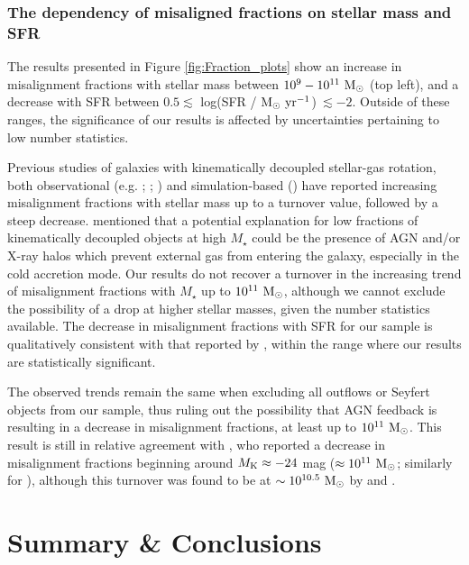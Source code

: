 \documentclass[fleqn,usenatbib]{mnras}
\begin{document}
\subsubsection{The dependency of misaligned fractions on stellar mass and SFR}
The results presented in Figure \ref{fig:Fraction_plots} show an increase in misalignment fractions with stellar mass between $10^9 - 10^{11}\ \rm{M_{\odot}}$ (top left), and a decrease with SFR between $0.5\lesssim$ log(SFR / $\rm{M_{\odot}\ yr^{-1}}$)$\ \lesssim -2$. Outside of these ranges, the significance of our results is affected by uncertainties pertaining to low number statistics. 

Previous studies of galaxies with kinematically decoupled stellar-gas rotation, both observational (e.g. \citealt{Davis2011}; \citealt{Jin2016}; \citealt{Zhou2022}) and simulation-based (\citealt{CdpLagos2015}) have reported increasing misalignment fractions with stellar mass up to a turnover value, followed by a steep decrease. 
\cite{Davis2011} mentioned that a potential explanation for low  fractions of kinematically decoupled objects at high $M_{\star}$ could be the presence of AGN and/or X-ray halos which prevent external gas from entering the galaxy, especially in the cold accretion mode. Our results do not recover a turnover in the increasing trend of misalignment fractions with $M_{\star}$ up to $10^{11}\ \rm{M_{\odot}}$, although we cannot exclude the possibility of a drop at higher stellar masses, given the number statistics available. 
The decrease in misalignment fractions with SFR for our sample is qualitatively consistent with that reported by \cite{Jin2016}, within the range where our results are statistically significant.

The observed trends remain the same when excluding all outflows or Seyfert objects from our sample, thus ruling out the possibility that AGN feedback is resulting in a decrease in misalignment fractions, at least up to $10^{11}\ \rm{M_{\odot}}$. This result is still in relative agreement with \cite{Davis2011}, who reported a decrease in misalignment fractions beginning around $M_{\rm{K}} \approx -24\ $mag ($\approx 10^{11}\ \rm{M_{\odot}}$; similarly for \citealt{Jin2016}), although this turnover was found to be at $\sim 10^{10.5}\ \rm{M_{\odot}}$ by \cite{CdpLagos2015} and \cite{Zhou2022}.
\section{Summary \& Conclusions}
\end{document}
